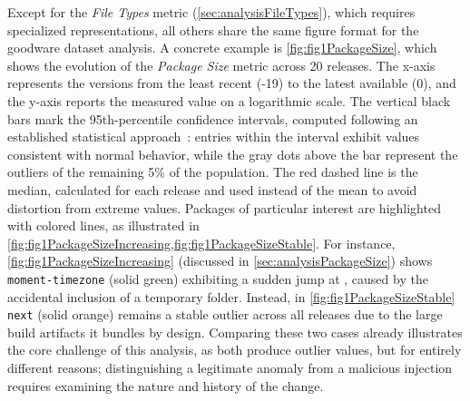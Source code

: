 Except for the \emph{File Types} metric (\cref{sec:analysisFileTypes}), 
which requires specialized representations, all others share the same figure format for the goodware dataset analysis.
A concrete example is \cref{fig:fig1PackageSize},
which shows the evolution of the \emph{Package Size} metric across 20 releases.
The x-axis represents the versions from the least recent (-19) to the latest available (0), 
and the y-axis reports the measured value on a logarithmic scale.
The vertical black bars mark the 95th-percentile confidence intervals, computed following an established statistical approach~\cite{article2}:
entries within the interval exhibit values consistent with normal behavior, 
while the gray dots above the bar represent the outliers of the remaining 5\% of the population.
The red dashed line is the median, calculated for each release and used instead of the mean to avoid distortion from extreme values.
Packages of particular interest are highlighted with colored lines, as illustrated in \cref{fig:fig1PackageSizeIncreasing,fig:fig1PackageSizeStable}. 
For instance, \cref{fig:fig1PackageSizeIncreasing} (discussed in \cref{sec:analysisPackageSize}) 
shows \texttt{moment-timezone} (solid green) exhibiting a sudden jump at {\large{}}, caused by the accidental inclusion of a temporary folder.
Instead, in \cref{fig:fig1PackageSizeStable} \texttt{next} (solid orange) remains a stable outlier across all releases
due to the large build artifacts it bundles by design.
Comparing these two cases already illustrates the core challenge of this analysis, 
as both produce outlier values, but for entirely different reasons;
distinguishing a legitimate anomaly from a malicious injection requires examining the nature and history of the change.

